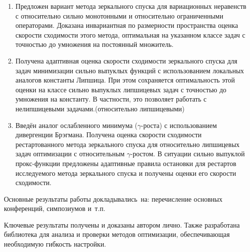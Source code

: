 {}
\begin{enumerate}[beginpenalty=10000] %
  \item Предложен вариант метода зеркального спуска для вариационных неравенств с относительно сильно монотонными и относительно ограниченными операторами. Доказана инвариантная по размерности пространства оценка скорости сходимости этого метода, оптимальная на указанном классе задач с точностью до умножения на постоянный множитель.
  \item Получена адаптивная оценка скорости сходимости зеркального спуска для задач минимизации сильно выпуклых функций с использованием локальных аналогов константы Липшица. При этом сохраняется оптимальность этой оценки на классе сильно выпуклых липшицевых задач с точностью до умножения на константу. В частности, это позволяет работать с нелипшицевыми задачами.(относительно липшицевыми)
  \item Введён аналог ослабленного минимума ($\gamma$-роста) с использованием дивергенции Брэгмана. Получена оценка скорости сходимости рестартованного метода зеркального спуска для относительно липшицевых задач оптимизации с относительным $\gamma$-ростом. В ситуации сильно выпуклой прокс-функции предложены адаптивные правила остановки для рестартов исследуемого метода зеркального спуска и получены оценки его скорости сходимости.
\end{enumerate}

{\probation}
Основные результаты работы докладывались~на:
перечисление основных конференций, симпозиумов и~т.\:п.

{\contribution} Ключевые результаты получены и доказаны автором лично. Также разработана библиотека для анализа и проверки методов оптимизации, обеспечивающая необходимую гибкость настройки. 

